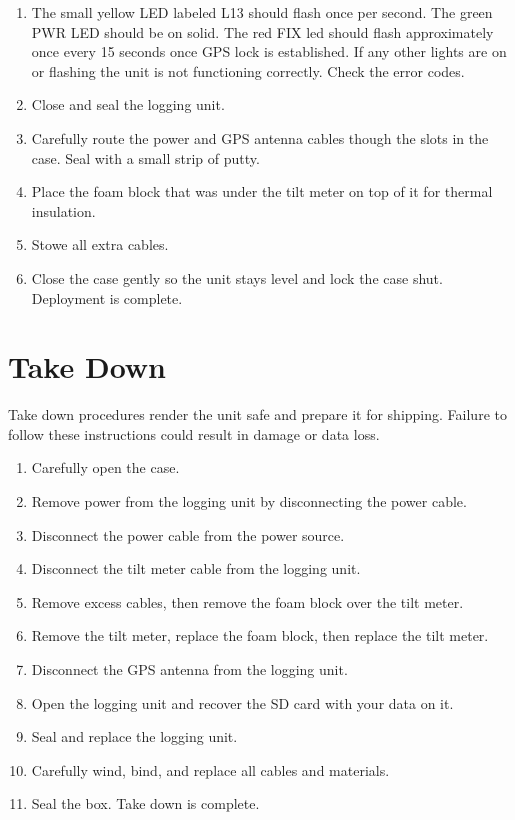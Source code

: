 \documentclass[11pt]{article} %
\begin{document}
\begin{enumerate}
\item The small yellow LED labeled L13 should flash once per second. The green PWR LED should be on solid. The red FIX led should flash approximately once every 15 seconds once GPS lock is established. If any other lights are on or flashing the unit is not functioning correctly. Check the error codes.
\item Close and seal the logging unit.
\item Carefully route the power and GPS antenna cables though the slots in the case. Seal with a small strip of putty.
\item Place the foam block that was under the tilt meter on top of it for thermal insulation.
\item Stowe all extra cables.
\item Close the case gently so the unit stays level and lock the case shut. Deployment is complete.
\end{enumerate}

\section{Take Down}
Take down procedures render the unit safe and prepare it for shipping. Failure to follow these instructions could result in damage or data loss.

\begin{enumerate}
\item Carefully open the case.
\item Remove power from the logging unit by disconnecting the power cable.
\item Disconnect the power cable from the power source.
\item Disconnect the tilt meter cable from the logging unit.
\item Remove excess cables, then remove the foam block over the tilt meter.
\item Remove the tilt meter, replace the foam block, then replace the tilt meter.
\item Disconnect the GPS antenna from the logging unit.
\item Open the logging unit and recover the SD card with your data on it.
\item Seal and replace the logging unit.
\item Carefully wind, bind, and replace all cables and materials.
\item Seal the box. Take down is complete.
\end{enumerate}
\end{document}
